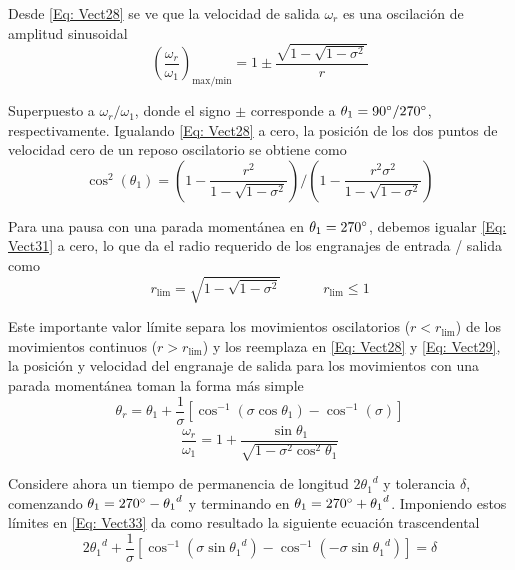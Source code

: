 \documentclass[12pt, final]{extarticle}
\begin{document}
Desde \eqref{Eq: Vect28} se ve que la velocidad de salida $\omega_r$ es una oscilación de amplitud sinusoidal
\begin{equation}
   (\frac{\omega_r}{\omega_1})_{\text{max/min}}=1 \pm \frac{\sqrt{1-\sqrt{1-{\sigma}^2}}}{r}
   \label{Eq: Vect30} 
\end{equation}

Superpuesto a $\omega_r / \omega_1$, donde el signo $\pm$ corresponde a $\theta_1= 90\degree / 270\degree$, respectivamente. Igualando \eqref{Eq: Vect28} a cero, la posición de los dos puntos de velocidad cero de un reposo oscilatorio se obtiene como
\begin{equation}
   \cos^{2}{(\theta_1)}=(1-\frac{{r}^2}{1-\sqrt{1-{\sigma}^2}})/(1-\frac{{r}^2{\sigma}^2}{1-\sqrt{1-{\sigma}^2}})
   \label{Eq: Vect31} 
\end{equation}

Para una pausa con una parada momentánea en $\theta_1= 270\degree$, debemos igualar \eqref{Eq: Vect31} a cero, lo que da el radio requerido de los engranajes de entrada / salida como
\begin{equation}
   r_{\text{lim}}=\sqrt{1-\sqrt{1-{\sigma}^2}} \quad\quad\quad  r_{\text{lim}} \leq 1
   \label{Eq: Vect32} 
\end{equation}

Este importante valor límite separa los movimientos oscilatorios ($r < r_{\text{lim}}$) de los movimientos continuos ($r > r_{\text{lim}}$) y los reemplaza en \eqref{Eq: Vect28} y \eqref{Eq: Vect29}, la posición y velocidad del engranaje de salida para los movimientos con una parada momentánea toman la forma más simple
\begin{equation}
   \theta_r=\theta_1+\frac{1}{\sigma}[\cos^{-1}{(\sigma\cos{\theta_1})}-\cos^{-1}{(\sigma)}]
   \label{Eq: Vect33} 
\end{equation}
\begin{equation}
   \frac{\omega_r}{\omega_1}=1+\frac{\sin{\theta_1}}{\sqrt{1-{\sigma}^2\cos^{2}{\theta_1}}}
   \label{Eq: Vect34} 
\end{equation}

Considere ahora un tiempo de permanencia de longitud $2{\theta_1}^d$ y tolerancia $\delta$, comenzando $\theta_1=270\degree-{\theta_1}^d$ y terminando en $\theta_1=270\degree+{\theta_1}^d$. Imponiendo estos límites en \eqref{Eq: Vect33} da como resultado la siguiente ecuación trascendental
\begin{equation}
   2{\theta_1}^d + \frac{1}{\sigma}[\cos^{-1}{(\sigma\sin{{\theta_1}^d})} - \cos^{-1}{(-\sigma\sin{{\theta_1}^d})}]= \delta
   \label{Eq: Vect35} 
\end{equation}
\end{document}
